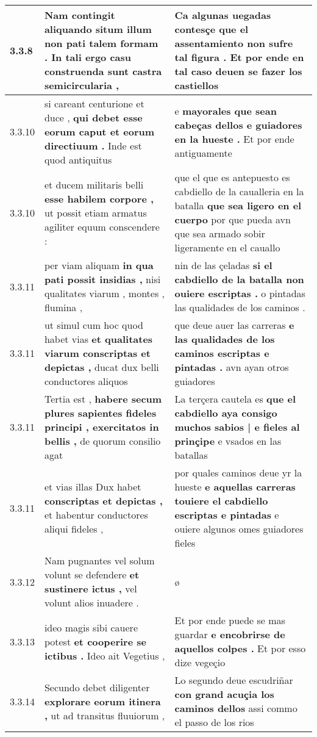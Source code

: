 \begin{tabular}{|p{1cm}|p{6.5cm}|p{6.5cm}|}
3.3.8 & Nam contingit aliquando situm \textbf{ illum non pati talem formam . } In tali ergo casu construenda sunt castra semicircularia , & Ca algunas uegadas \textbf{ contesçe que el assentamiento non sufre tal figura . } Et por ende en tal caso deuen se fazer los castiellos \\\hline
3.3.10 & si careant centurione et duce , \textbf{ qui debet esse eorum caput et eorum directiuum . } Inde est quod antiquitus & e \textbf{ mayorales que sean cabeças dellos e guiadores en la hueste . } Et por ende antiguamente \\\hline
3.3.10 & et ducem militaris belli \textbf{ esse habilem corpore , } ut possit etiam armatus agiliter equum conscendere : & que el que es antepuesto es cabdiello de la caualleria en la batalla \textbf{ que sea ligero en el cuerpo } por que pueda avn que sea armado sobir ligeramente en el cauallo \\\hline
3.3.11 & per viam aliquam \textbf{ in qua pati possit insidias , } nisi qualitates viarum , montes , flumina , & nin de las çeladas \textbf{ si el cabdiello de la batalla non ouiere escriptas . } o pintadas las qualidades de los caminos . \\\hline
3.3.11 & ut simul cum hoc quod habet vias \textbf{ et qualitates viarum conscriptas et depictas , } ducat dux belli conductores aliquos & que deue auer las carreras \textbf{ e las qualidades de los caminos escriptas e pintadas . } avn ayan otros guiadores \\\hline
3.3.11 & Tertia est , \textbf{ habere secum plures sapientes fideles principi , exercitatos in bellis , } de quorum consilio agat & La terçera cautela es \textbf{ que el cabdiello aya consigo muchos sabios | e fieles al prinçipe } e vsados en las batallas \\\hline
3.3.11 & et vias illas Dux habet \textbf{ conscriptas et depictas , } et habentur conductores aliqui fideles , & por quales caminos deue yr la hueste \textbf{ e aquellas carreras touiere el cabdiello escriptas e pintadas } e ouiere algunos omes guiadores fieles \\\hline
3.3.12 & Nam pugnantes vel solum volunt se defendere \textbf{ et sustinere ictus , } vel volunt alios inuadere . & ø \\\hline
3.3.13 & ideo magis sibi cauere potest \textbf{ et cooperire se ictibus . } Ideo ait Vegetius , & Et por ende puede se mas guardar \textbf{ e encobrirse de aquellos colpes . } Et por esso dize vegeçio \\\hline
3.3.14 & Secundo debet diligenter \textbf{ explorare eorum itinera , } ut ad transitus fluuiorum , & Lo segundo deue escudriñar \textbf{ con grand acuçia los caminos dellos } assi commo el passo de los rios \\\hline

\end{tabular}

